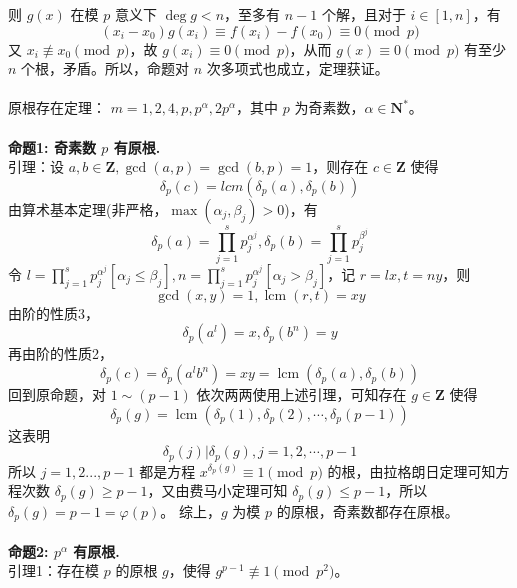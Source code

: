 \documentclass[12pt,a4paper]{article}
\begin{document}
则 $g(x)$ 在模 $p$ 意义下 $\deg g<n$，至多有 $n-1$ 个解，且对于 $i\in[1,n]$，有 
\begin{equation*}
	(x_i-x_0)g(x_i)\equiv f(x_i)-f(x_0)\equiv0\pmod p
\end{equation*}
又 $x_i\not\equiv x_0\pmod p$，故 $g(x_i)\equiv0\pmod p$，从而 $g(x)\equiv0\pmod p$ 有至少 $n$ 个根，矛盾。所以，命题对 $n$ 次多项式也成立，定理获证。\\
\\
原根存在定理： $m=1,2,4,p,p^\alpha,2p^\alpha$，其中 $p$ 为奇素数，$\alpha\in\mathbf{N^*}$。
\\
\\
\textbf{命题1: 奇素数 $p$ 有原根.}
\\引理：设 $a, b\in\mathbf{Z},\gcd(a,p)=\gcd(b,p)=1$，则存在 $c\in\mathbf{Z}$ 使得 \begin{equation*}
	\delta_p(c)=lcm(\delta_p(a),\delta_p(b))
\end{equation*}
由算术基本定理(非严格，$\max(\alpha_j,\beta_j)>0$)，有 
\begin{equation*}
	\displaystyle \delta_p(a)=\prod_{j=1}^{s}p_j^{\alpha^{j}},\delta_p(b)=\prod_{j=1}^{s}p_j^{\beta^{j}}
\end{equation*}
令 $\displaystyle l=\prod_{j=1}^{s}p_j^{\alpha^{j}}[\alpha_j\le\beta_j],n=\prod_{j=1}^{s}p_j^{\alpha^{j}}[\alpha_j>\beta_j]$，记 $r=lx,t=ny$，则 \begin{equation*}
	\gcd(x,y)=1,\operatorname{lcm}(r,t)=xy
\end{equation*}
由阶的性质3，\begin{equation*}
	\displaystyle\delta_p(a^l)=x,\delta_p(b^n)=y
\end{equation*}
再由阶的性质2，
\begin{equation*}
	\displaystyle\delta_p(c)=\delta_p(a^lb^n)=xy=\operatorname{lcm}(\delta_p(a),\delta_p(b))
\end{equation*}
回到原命题，对 $1\sim(p-1)$ 依次两两使用上述引理，可知存在 $g\in\mathbf{Z}$ 使得 
\begin{equation*}
	\delta_p(g)=\operatorname{lcm}\left(\delta_p(1),\delta_p(2),\cdots,\delta_p(p-1)\right)
\end{equation*}
这表明 
\begin{equation*}\delta_p(j)|\delta_p(g),j=1,2,\cdots,p-1\end{equation*}
所以 $j=1,2...,p-1$ 都是方程 $x^{\delta_p(g)}\equiv1\pmod p$ 的根，由拉格朗日定理可知方程次数 $\delta_p(g)\ge p-1$，又由费马小定理可知 $\delta_p(g)\le p-1$，所以 $\delta_p(g)=p-1=\varphi(p)$。
综上，$g$ 为模 $p$ 的原根，奇素数都存在原根。
\\
\\
\textbf{命题2: $p^{\alpha}$ 有原根.}
\\引理1：存在模 $p$ 的原根 $g$，使得 $g^{p-1}\not\equiv1\pmod{p^2}$。
\end{document}
